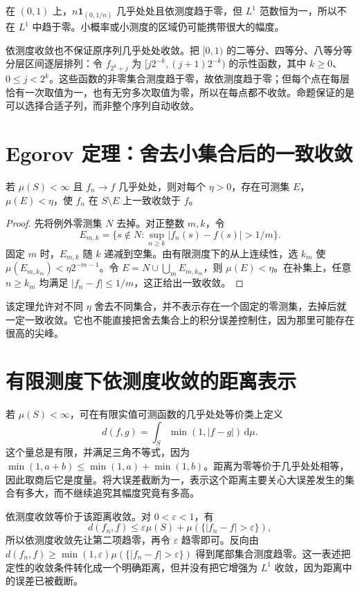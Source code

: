 在 $(0,1)$ 上，$n\mathbf1_{(0,1/n)}$ 几乎处处且依测度趋于零，但 $L^1$ 范数恒为一，所以不在 $L^1$ 中趋于零。小概率或小测度的区域仍可能携带很大的幅度。

依测度收敛也不保证原序列几乎处处收敛。把 $[0,1)$ 的二等分、四等分、八等分等分层区间逐层排列：令 $f_{2^k+j}$ 为
$[j2^{-k},(j+1)2^{-k})$ 的示性函数，其中 $k\geq0$、$0\leq j<2^k$。这些函数的非零集合测度趋于零，故依测度趋于零；但每个点在每层恰有一次取值为一，也有无穷多次取值为零，所以在每点都不收敛。命题保证的是可以选择合适子列，而非整个序列自动收敛。

\section{Egorov 定理：舍去小集合后的一致收敛}
\begin{theorem}[Egorov 定理]
若 $\mu(S)<\infty$ 且 $f_n\to f$ 几乎处处，则对每个 $\eta>0$，存在可测集 $E$，$\mu(E)<\eta$，使 $f_n$ 在 $S\setminus E$ 上一致收敛于 $f$。
\label{thm:mt-egorov}
\end{theorem}
\begin{proof}
先将例外零测集 $N$ 去掉。对正整数 $m,k$，令
\[
 E_{m,k}=\{s\notin N:\sup_{n\geq k}|f_n(s)-f(s)|>1/m\}.
\]
固定 $m$ 时，$E_{m,k}$ 随 $k$ 递减到空集。由有限测度下的从上连续性，选 $k_m$ 使 $\mu(E_{m,k_m})<\eta2^{-m-1}$。令 $E=N\cup\bigcup_mE_{m,k_m}$，则 $\mu(E)<\eta$。在补集上，任意 $n\geq k_m$ 均满足 $|f_n-f|\leq1/m$，这正给出一致收敛。
\end{proof}
该定理允许对不同 $\eta$ 舍去不同集合，并不表示存在一个固定的零测集，去掉后就一定一致收敛。它也不能直接把舍去集合上的积分误差控制住，因为那里可能存在很高的尖峰。

\section{有限测度下依测度收敛的距离表示}
若 $\mu(S)<\infty$，可在有限实值可测函数的几乎处处等价类上定义
\[
 d(f,g)=\int_S\min(1,|f-g|)\,\mathrm d\mu.
\]
这个量总是有限，并满足三角不等式，因为
$\min(1,a+b)\leq\min(1,a)+\min(1,b)$。距离为零等价于几乎处处相等，因此取商后它是度量。将大误差截断为一，表示这个距离主要关心大误差发生的集合有多大，而不继续追究其幅度究竟有多高。

依测度收敛等价于该距离收敛。对 $0<\varepsilon<1$，有
\[
 d(f_n,f)\leq\varepsilon\mu(S)+\mu(\{|f_n-f|>\varepsilon\}),
\]
所以依测度收敛先让第二项趋零，再令 $\varepsilon$ 趋零即可。反向由
$d(f_n,f)\geq\min(1,\varepsilon)\mu(\{|f_n-f|>\varepsilon\})$
得到尾部集合测度趋零。这一表述把定性的收敛条件转化成一个明确距离，但并没有把它增强为 $L^1$ 收敛，因为距离中的误差已被截断。

